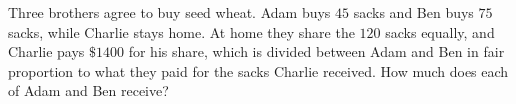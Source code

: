 Three brothers agree to buy seed wheat. Adam buys $45$ sacks and Ben buys $75$ sacks, while Charlie stays home. At home they share the $120$ sacks equally, and Charlie pays $\$1400$ for his share, which is divided between Adam and Ben in fair proportion to what they paid for the sacks Charlie received. How much does each of Adam and Ben receive?

